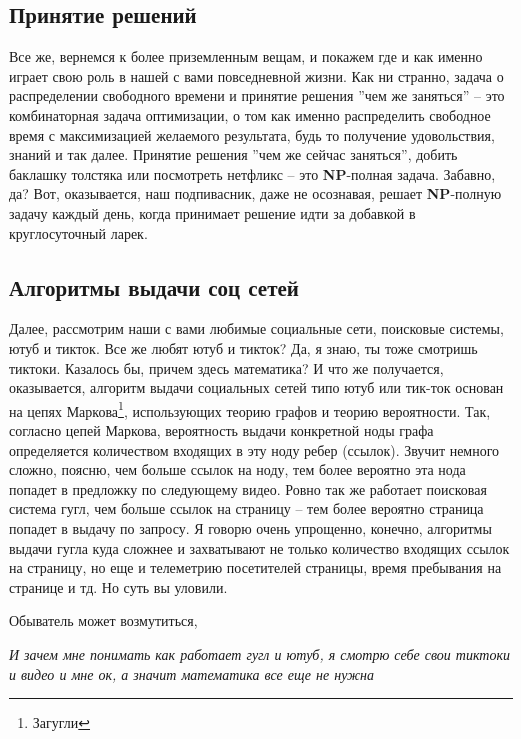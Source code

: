 \subsection{Принятие решений}\label{subsec:decision-making}
Все же, вернемся к более приземленным вещам, и покажем где и как именно играет свою роль в нашей с вами повседневной жизни.
Как ни странно, задача о распределении свободного времени и принятие решения ''чем же заняться'' -- это комбинаторная задача оптимизации,
о том как именно распределить свободное время с максимизацией желаемого результата,
будь то получение удовольствия, знаний и так далее.
Принятие решения ''чем же сейчас заняться'', добить баклашку толстяка или посмотреть нетфликс -- это \textbf{NP}-полная задача.
Забавно, да?
Вот, оказывается, наш подпивасник, даже не осознавая, решает \textbf{NP}-полную задачу каждый день,
когда принимает решение идти за добавкой в круглосуточный ларек.

\subsection{Алгоритмы выдачи соц сетей}\label{subsec:social-media}

Далее, рассмотрим наши с вами любимые социальные сети, поисковые системы, ютуб и тикток.
Все же любят ютуб и тикток?
Да, я знаю, ты тоже смотришь тиктоки.
Казалось бы, причем здесь математика?
И что же получается, оказывается, алгоритм выдачи социальных сетей типо ютуб или тик-ток основан на цепях Маркова\footnote{Загугли},
использующих теорию графов и теорию вероятности.
Так, согласно цепей Маркова, вероятность выдачи конкретной ноды графа определяется количеством входящих в эту ноду ребер (ссылок).
Звучит немного сложно, поясню, чем больше ссылок на ноду, тем более вероятно эта нода попадет в предложку по следующему видео.
Ровно так же работает поисковая система гугл, чем больше ссылок на страницу -- тем более вероятно страница попадет в выдачу
по запросу.
Я говорю очень упрощенно, конечно, алгоритмы выдачи гугла куда сложнее и захватывают не только количество входящих ссылок на страницу,
но еще и телеметрию посетителей страницы, время пребывания на странице и тд.
Но суть вы уловили.

Обыватель может возмутиться,

\begin{displayquote}
    \textit{
        И зачем мне понимать как работает гугл и ютуб, я смотрю себе свои тиктоки и видео и мне ок, а значит математика все еще не нужна
    }
\end{displayquote}

